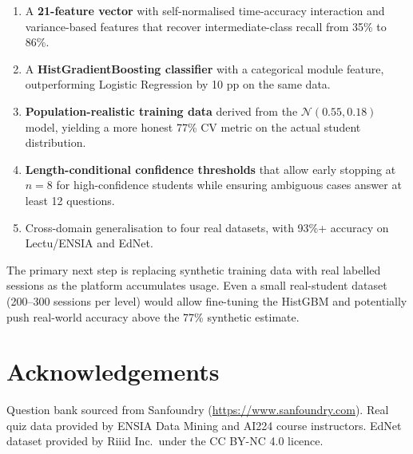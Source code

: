 \documentclass[12pt,a4paper]{article}
\begin{document}
\begin{enumerate}[noitemsep]
  \item A \textbf{21-feature vector} with self-normalised time-accuracy interaction
        and variance-based features that recover intermediate-class recall from 35\%
        to 86\%.
  \item A \textbf{HistGradientBoosting classifier} with a categorical module feature,
        outperforming Logistic Regression by 10 pp on the same data.
  \item \textbf{Population-realistic training data} derived from the
        $\mathcal{N}(0.55, 0.18)$ model, yielding a more honest 77\% CV metric on
        the actual student distribution.
  \item \textbf{Length-conditional confidence thresholds} that allow early stopping
        at $n=8$ for high-confidence students while ensuring ambiguous cases answer
        at least 12 questions.
  \item Cross-domain generalisation to four real datasets, with 93\%+ accuracy on
        Lectu/ENSIA and EdNet.
\end{enumerate}

The primary next step is replacing synthetic training data with real labelled sessions
as the platform accumulates usage. Even a small real-student dataset (200--300 sessions
per level) would allow fine-tuning the HistGBM and potentially push real-world accuracy
above the 77\% synthetic estimate.

\section*{Acknowledgements}

Question bank sourced from Sanfoundry (\url{https://www.sanfoundry.com}).
Real quiz data provided by ENSIA Data Mining and AI224 course instructors.
EdNet dataset provided by Riiid Inc.\ under the CC BY-NC 4.0 licence.
\end{document}
